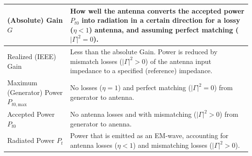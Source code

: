 \noindent{}

\begin{tabular}{p{3cm}p{4cm}}
        \toprule
        (Absolute) Gain $G$ & How well the antenna converts the accepted power $P_{t0}$ into radiation in a certain direction for a lossy ($\eta<1$) antenna, and assuming perfect matching ($|\Gamma|^2 = 0$).\\\midrule
        Realized (IEEE) Gain & Less than the absolute Gain. Power is reduced by mismatch losses ($|\Gamma|^2 > 0$) of the antenna input impedance to a specified (reference) impedance.\\\midrule
        Maximum (Generator) Power $P_{t0,\mathrm{max}}$ & No losses ($\eta=1$) and perfect matching ($|\Gamma|^2 = 0$) from generator to antenna.\\\midrule
        Accepted Power $P_{t0}$ & No antenna losses and with mismatching ($|\Gamma|^2 > 0$) from generator to anenna.\\\midrule
        Radiated Power $P_t$ & Power that is emitted as an EM-wave, accounting for antenna losses ($\eta < 1$) and mismatching losses ($|\Gamma|^2 > 0$).\\
        \bottomrule
\end{tabular}
